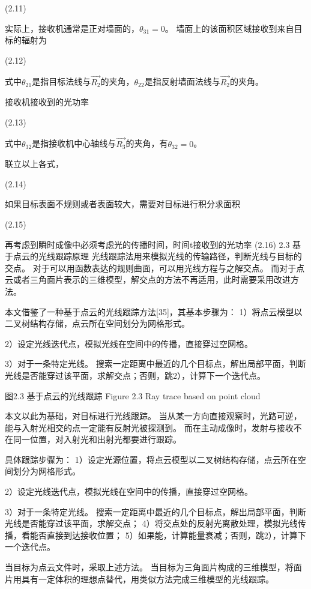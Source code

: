 	  	(2.11)

实际上，接收机通常是正对墙面的，$\theta_{31}=0$。
墙面上的该面积区域接收到来自目标的辐射为

	  	(2.12)

式中$\theta_{21}$是指目标法线与$\vec{R_2}$的夹角，$\theta_{22}$是指反射墙面法线与$\vec{R_2}$的夹角。

接收机接收到的光功率

	  	(2.13)

式中$\theta_{32}$是指接收机中心轴线与$\vec{R_3}$的夹角，有$\theta_{32}=0$。

联立以上各式，

	  	(2.14)

如果目标表面不规则或者表面较大，需要对目标进行积分求面积

	  	(2.15)

再考虑到瞬时成像中必须考虑光的传播时间，时间t接收到的光功率
	  	(2.16)
2.3  基于点云的光线跟踪原理
光线跟踪法用来模拟光线的传输路径，判断光线与目标的交点。
对于可以用函数表达的规则曲面，可以用光线方程与之解交点。
而对于点云或者三角面片表示的三维模型，解交点的方法不再适用，此时需要采用改进方法。

本文借鉴了一种基于点云的光线跟踪方法[35]，其基本步骤为：
1）将点云模型以二叉树结构存储，点云所在空间划分为网格形式。

2）设定光线迭代点，模拟光线在空间中的传播，直接穿过空网格。

3）对于一条特定光线。
搜索一定距离中最近的几个目标点，解出局部平面，判断光线是否能穿过该平面，求解交点；否则，跳2），计算下一个迭代点。


 
图2.3  基于点云的光线跟踪
Figure 2.3 Ray trace based on point cloud

本文以此为基础，对目标进行光线跟踪。
当从某一方向直接观察时，光路可逆，能与入射光相交的点一定能有反射光被探测到。
而在主动成像时，发射与接收不在同一位置，对入射光和出射光都要进行跟踪。

具体跟踪步骤为：
1）设定光源位置，将点云模型以二叉树结构存储，点云所在空间划分为网格形式。

2）设定光线迭代点，模拟光线在空间中的传播，直接穿过空网格。

3）对于一条特定光线。
搜索一定距离中最近的几个目标点，解出局部平面，判断光线是否能穿过该平面，求解交点；
4）将交点处的反射光离散处理，模拟光线传播，看能否直接到达接收位置；
5）如果能，计算能量衰减；否则，跳2），计算下一个迭代点。

当目标为点云文件时，采取上述方法。
当目标为三角面片构成的三维模型，将面片用具有一定体积的理想点替代，用类似方法完成三维模型的光线跟踪。

